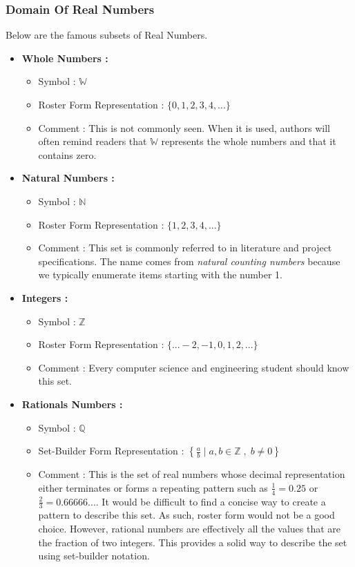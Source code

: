 \subsubsection*{Domain Of Real Numbers}
Below are the famous subsets of Real Numbers.
\begin{itemize}
    \item \textbf{Whole Numbers : }
        \begin{itemize}
            \item Symbol : $\mathbb{W}$
            \item Roster Form Representation : $\{0,1,2,3,4,...\}$
            \item Comment : This is not commonly seen.  When it is used, authors will often remind readers that $\mathbb{W}$ represents the whole numbers and that it contains zero.
        \end{itemize}
    \item \textbf{Natural Numbers : }
        \begin{itemize}
            \item Symbol : $\mathbb{N}$
            \item Roster Form Representation : $\{1,2,3,4,...\}$
            \item Comment : This set is commonly referred to in literature and project specifications. The name comes from \emph{natural counting numbers} because we typically enumerate items starting with the number 1.
        \end{itemize}      
    \item \textbf{Integers : }
        \begin{itemize}
            \item Symbol : $\mathbb{Z}$
            \item Roster Form Representation : $\{...-2,-1,0,1,2,...\}$
            \item Comment : Every computer science and engineering student should know this set.
        \end{itemize}              
    \item \textbf{Rationals Numbers : }
        \begin{itemize}
            \item Symbol : $\mathbb{Q}$
            \item Set-Builder Form Representation : $\left\{ \frac{a}{b} \mid a,b \in \mathbb{Z} \;,\; b \neq 0\right\}$
            \item Comment : This is the set of real numbers whose decimal representation either terminates or forms a repeating pattern such as $\frac{1}{4}=0.25$ or $\frac{2}{3} = 0.66666...$.  It would be difficult to find a concise way to create a pattern to describe this set.  As such, roster form would not be a good choice.  However, rational numbers are effectively all the values that are the fraction of two integers.  This provides a solid way to describe the set using set-builder notation.  

\end{itemize}
\end{itemize}
